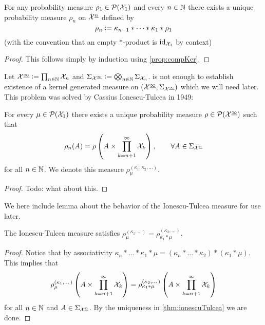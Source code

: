 \documentclass{article}
\begin{document}
\begin{prop}
  For any probability measure $\rho_1 \in \mathcal{P}(\mathcal{X}_1)$
  and every $n \in \mathbb{N}$ there exists a unique probability measure 
  $\rho_n$ on $\mathcal{X}^{\underline{n}}$ defined by
  \[ \rho_n \vcentcolon= \kappa_{n-1} * \dots * \kappa_1 * \rho_1 \]
  (with the convention that an empty $*$-product is $\text{id}_{\mathcal{X}_1}$
  by context)
  \label{prop:finSeqKer}
\end{prop}
\begin{proof}
  This follows simply by induction using \cref{prop:compKer}.
\end{proof}

Let $\mathcal{X}^{\underline{\infty}} \vcentcolon= \prod_{n \in \mathbb{N}} \mathcal{X}_n$
and $\Sigma_{\mathcal{X}^{\underline{\infty}}} \vcentcolon= \bigotimes_{n \in \mathbb{N}}
\Sigma_{\mathcal{X}_n}$.
 is not enough to establish existence of a
kernel generated measure on
$(\mathcal{X}^{\underline{\infty}}, \Sigma_{\mathcal{X}^{\underline{\infty}}})$ 
which we will need later.
This problem was solved by Cassius Ionescu-Tulcea in 1949:

\begin{thm}
  For every $\mu \in \mathcal{P}(\mathcal{X}_1)$ 
  there exists a unique probability measure
  $\rho \in \mathcal{P}(\mathcal{X}^{\underline{\infty}})$ such that
  \[ \rho_n(A) = \rho \left( A \times \prod_{k=n+1}^\infty \mathcal{X}_k \right)
  , \qquad \forall A \in \Sigma_{\mathcal{X}^{\underline{n}}} \]
  for all $n \in \mathbb{N}$.
  We denote this measure
  $\rho_\mu^{(\kappa_1, \kappa_2, \dots)}$.
  \label{thm:ionescuTulcea}
\end{thm}
\begin{proof}
  Todo: what about this.
\end{proof}

We here include lemma about the behavior of the Ionescu-Tulcea measure
for use later.
\begin{lem}
  The Ionescu-Tulcea measure satisfies
  $\rho_\mu^{(\kappa_1, \dots)}
  = \rho_{\kappa_1 * \mu}^{(\kappa_2, \dots)}$.
  \label{lem:ionescu}
\end{lem}
\begin{proof}
  Notice that by associativity
  $\kappa_n * \dots * \kappa_1 * \mu
  = (\kappa_n * \dots * \kappa_2) * (\kappa_1 * \mu)$.
  This implies that
  \[ \rho_{\mu}^{(\kappa_1, \dots)}
    \left( A \times \prod_{k=n+1}^\infty \mathcal{X}_k \right)
    = \rho_{\kappa_1 * \mu}^{(\kappa_2, \dots)}
  \left( A \times \prod_{k=n+1}^\infty \mathcal{X}_k \right) \]
  for all $n \in \mathbb{N}$ and $A \in \Sigma_{\mathcal{X}^{\underline{n}}}$.
  By the uniqueness in \cref{thm:ionescuTulcea} we are done.
\end{proof}
\end{document}
